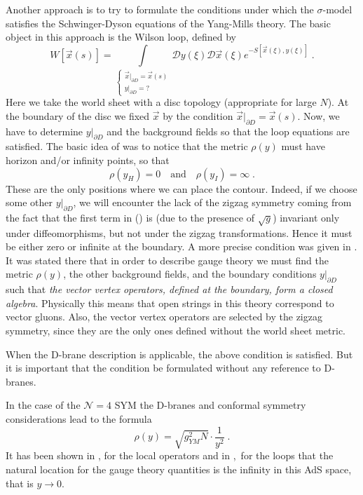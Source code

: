 \documentclass[a4paper,12pt]{article}
\numberwithin{equation}{section}
\begin{document}
Another approach \cite{1} is to try to formulate the conditions under which
the \( \sigma  \)-model satisfies the Schwinger-Dyson equations of the Yang-Mills
theory. The basic object in this approach is the Wilson loop, defined by
\[
W[\vec{x}(s)]=\int\limits _{\left\{ \begin{array}{c}
\vec{x}|_{\partial D}=\vec{x}(s)\\
y|_{\partial D}=?
\end{array}\right. }\mathcal{D}y(\xi )\mathcal{D}\vec{x}(\xi )e^{-S[\vec{x}(\xi ),y(\xi )]}\; .\]
 Here we take the world sheet with a disc topology (appropriate for large \( N \)).
At the boundary of the disc we fixed \( \vec{x} \) by the condition \( \vec{x}|_{\partial D}=\vec{x}(s) \).
Now, we have to determine \( y|_{\partial D} \) and the background fields so
that the loop equations are satisfied. The basic idea of \cite{1} was to notice
that the metric \( \rho (y) \) must have horizon and/or infinity points, so
that
\[
\rho (y_{H})=0\quad \textrm{and}\quad \rho (y_{I})=\infty \; .\]
 These are the only positions where we can place the contour. Indeed, if we
choose some other \( y|_{\partial D} \), we will encounter the lack of the
zigzag symmetry coming from the fact that the first term in (\pageref{3.1})
is (due to the presence of \( \sqrt{g} \)) invariant only under diffeomorphisms,
but not under the zigzag transformations. Hence it must be either zero or infinite
at the boundary. A more precise condition was given in \cite{12}. It was stated
there that in order to describe gauge theory we must find the metric \( \rho (y) \),
the other background fields, and the boundary conditions \( y|_{\partial D} \)
such that \emph{the vector vertex operators, defined at the boundary, form a
closed algebra}. Physically this means that open strings in this theory correspond
to vector gluons. Also, the vector vertex operators are selected by the zigzag
symmetry, since they are the only ones defined without the world sheet metric.

When the D-brane description is applicable, the above condition is satisfied.
But it is important that the condition be formulated without any reference to
D-branes. 

In the case of the \( \mathcal{N}=4 \) SYM the D-branes and conformal symmetry
considerations lead to the formula \cite{3}
\begin{equation}
\label{3.7}
\rho (y)=\sqrt{{g_{YM}^{2}N}}\cdot \frac{1}{y^{2}}\; .
\end{equation}
 It has been shown in \cite{4}, \cite{5} for the local operators and in \cite{13},\,\cite{14}
for the loops that the natural location for the gauge theory quantities is the
infinity in this AdS space, that is \( y\to 0 \). 
\end{document}
